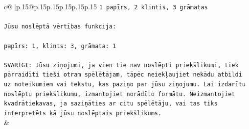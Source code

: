 \documentclass{article}
\begin{document}
{\begin{supertabular}{c@{$\;$}|p{.15\linewidth}@{}p{.15\linewidth}p{.15\linewidth}p{.15\linewidth}p{.15\linewidth}p{.15\linewidth}}
{{{\texttt{1 papīrs, 2 klintis, 3 grāmatas} \\
\\ 
\texttt{Jūsu noslēptā vērtības funkcija:} \\
\\ 
\texttt{papīrs: 1, klints: 3, grāmata: 1} \\
\\ 
\texttt{SVARĪGI: Jūsu ziņojumi, ja vien tie nav noslēpti priekšlikumi, tiek pārraidīti tieši otram spēlētājam, tāpēc neiekļaujiet nekādu atbildi uz noteikumiem vai tekstu, kas paziņo par jūsu ziņojumu. Lai izdarītu noslēptu priekšlikumu, izmantojiet norādīto formātu. Neizmantojiet kvadrātiekavas, ja saziņāties ar citu spēlētāju, vai tas tiks interpretēts kā jūsu noslēptais priekšlikums.} \\
            }
        }
    }
    & \\ \\


\end{supertabular}}
\end{document}
